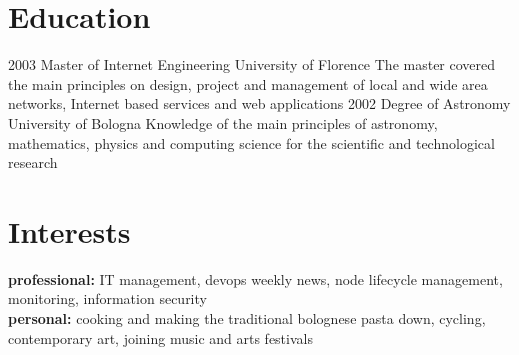 \documentclass[]{friggeri-cv} %
\begin{document}
\section{Education}
\begin{entrylist}
\entry
{2003}
{Master {\normalfont of Internet Engineering}}
{University of Florence}
{The master covered the main principles on design, project and management of local and wide area networks, Internet based services and web applications}
\entry
{2002}
{Degree {\normalfont of Astronomy}}
{University of Bologna}
{Knowledge of the main principles of astronomy, mathematics, physics and computing science for the scientific and technological research}
\end{entrylist}



\section{Interests}

\textbf{professional:} IT management, devops weekly news, node lifecycle management, monitoring, information security\\
\textbf{personal:} cooking and making the traditional bolognese pasta down, cycling, contemporary art, joining music and arts festivals
\end{document}
